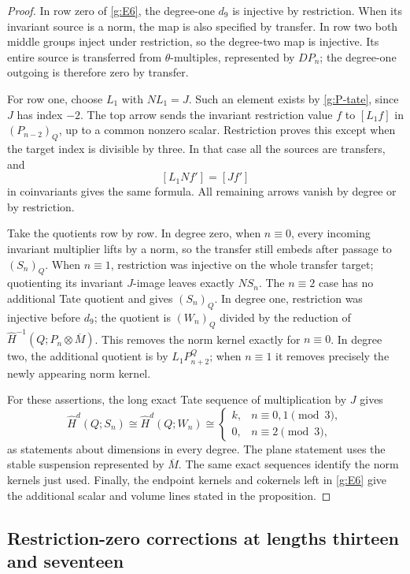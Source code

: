 \begin{proof}
In row zero of \eqref{g:E6}, the degree-one $d_9$ is injective
by restriction.  When its invariant source is a norm, the map
is also specified by transfer.  In row two both middle groups
inject under restriction, so the degree-two map is injective.
Its entire source is transferred from $\theta$-multiples,
represented by $DP_n$; the degree-one outgoing is therefore
zero by transfer.

For row one, choose $L_1$ with $NL_1=J$.  Such an element
exists by \eqref{g:P-tate}, since $J$ has index $-2$.
The top arrow sends the invariant restriction value $f$ to
$[L_1f]$ in $(P_{n-2})_Q$, up to a common nonzero scalar.
Restriction proves this except when the target index is
divisible by three.  In that case all the sources are
transfers, and
\[
 [L_1Nf']=[Jf']
\]
in coinvariants gives the same formula.  All remaining arrows
vanish by degree or by restriction.

Take the quotients row by row.  In degree zero, when
$n\equiv0$, every incoming invariant multiplier lifts by a
norm, so the transfer still embeds after passage to
$(S_n)_Q$.  When $n\equiv1$, restriction was injective on
the whole transfer target; quotienting its invariant
$J$-image leaves exactly $NS_n$.  The $n\equiv2$ case
has no additional Tate quotient and gives $(S_n)_Q$.
In degree one, restriction was injective before $d_9$;
the quotient is $(W_n)_Q$ divided by the reduction of
$\widehat H^{-1}(Q;P_n\otimes\overline M)$.  This removes
the norm kernel exactly for $n\equiv0$.  In degree two,
the additional quotient is by $L_1P_{n+2}^Q$; when
$n\equiv1$ it removes precisely the newly appearing norm
kernel.

For these assertions, the long exact Tate sequence of
multiplication by $J$ gives
\[
 \widehat H^d(Q;S_n)\cong\widehat H^d(Q;W_n)
 \cong
 \begin{cases}k,&n\equiv0,1\pmod3,\\0,&n\equiv2\pmod3,
 \end{cases}
\]
as statements about dimensions in every degree.  The plane
statement uses the stable suspension represented by
$\overline M$.  The same exact sequences identify the
norm kernels just used.  Finally, the endpoint kernels
and cokernels left in \eqref{g:E6} give the additional
scalar and volume lines stated in the proposition.
\end{proof}

\subsection{Restriction-zero corrections at lengths thirteen and seventeen}

